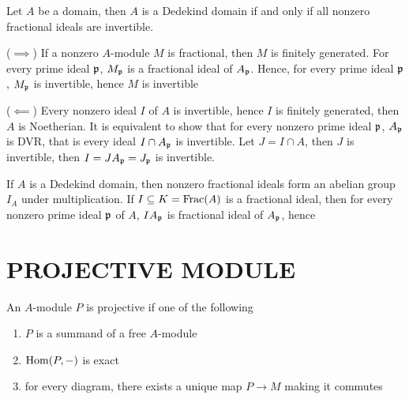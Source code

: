 \begin{theorem}
	Let $A$ be a domain, then $A$ is a Dedekind domain if and only if all nonzero fractional ideals are invertible.
\end{theorem}

\begin{longproof}
	($\implies$) If a nonzero $A$-module $M$ is fractional, then $M$ is finitely generated. For every prime ideal $\mathfrak{p}$, $M_{\mathfrak{p}}$ is a fractional ideal of $A_{\mathfrak{p}}$. Hence, for every prime ideal $\mathfrak{p}$, $M_{\mathfrak{p}}$ is invertible, hence $M$ is invertible
	
	($\impliedby$) Every nonzero ideal $I$ of $A$ is invertible, hence $I$ is finitely generated, then $A$ is Noetherian. It is equivalent to show that for every nonzero prime ideal $\mathfrak{p}$, $A_{\mathfrak{p}}$ is DVR, that is every ideal $I \cap A_{\mathfrak{p}}$ is invertible. Let $J = I \cap A$, then $J$ is invertible, then $I = J A_{\mathfrak{p}} = J_{\mathfrak{p}}$ is invertible.
\end{longproof}

\begin{corollary}
	If $A$ is a Dedekind domain, then nonzero fractional ideals form an abelian group $I_A$ under multiplication. If $I \subseteq K = \operatorname{Frac}(A)$ is a fractional ideal, then for every nonzero prime ideal $\mathfrak{p}$ of $A$, $I A_{\mathfrak{p}}$ is fractional ideal of $A_{\mathfrak{p}}$, hence 
\end{corollary}



\section{PROJECTIVE MODULE}

\begin{definition}
	An $A$-module $P$ is projective if one of the following
	\begin{enumerate}
		\item $P$ is a summand of a free $A$-module
		\item $\operatorname{Hom}(P, -)$ is exact
		\item for every diagram, there exists a unique map $P \to M$ making it commutes
		\begin{center}
		\end{center}
	\end{enumerate}
\end{definition}


